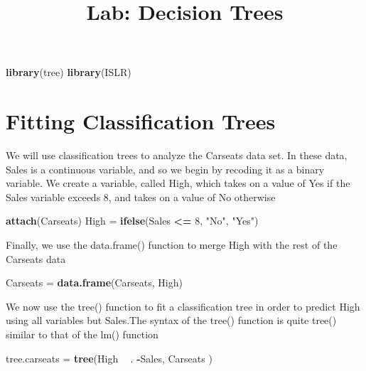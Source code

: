 \documentclass[]{article}
\title{Lab: Decision Trees}
\author{}
\date{}
\newenvironment{Shaded}{\begin{snugshade}}{\end{snugshade}}
\newcommand{\KeywordTok}[1]{\textcolor[rgb]{0.13,0.29,0.53}{\textbf{#1}}}
\newcommand{\DecValTok}[1]{\textcolor[rgb]{0.00,0.00,0.81}{#1}}
\newcommand{\StringTok}[1]{\textcolor[rgb]{0.31,0.60,0.02}{#1}}
\newcommand{\OperatorTok}[1]{\textcolor[rgb]{0.81,0.36,0.00}{\textbf{#1}}}
\newcommand{\NormalTok}[1]{#1}
\begin{document}
\maketitle

\begin{Shaded}
\begin{Highlighting}[]
\KeywordTok{library}\NormalTok{(tree)}
\KeywordTok{library}\NormalTok{(ISLR)}
\end{Highlighting}
\end{Shaded}

\section{Fitting Classification
Trees}\label{fitting-classification-trees}

We will use classification trees to analyze the Carseats data set. In
these data, Sales is a continuous variable, and so we begin by recoding
it as a binary variable. We create a variable, called High, which takes
on a value of Yes if the Sales variable exceeds 8, and takes on a value
of No otherwise

\begin{Shaded}
\begin{Highlighting}[]
\KeywordTok{attach}\NormalTok{(Carseats)}
\NormalTok{High =}\StringTok{ }\KeywordTok{ifelse}\NormalTok{(Sales }\OperatorTok{<=}\StringTok{ }\DecValTok{8}\NormalTok{, }\StringTok{"No"}\NormalTok{, }\StringTok{"Yes"}\NormalTok{)}
\end{Highlighting}
\end{Shaded}

Finally, we use the data.frame() function to merge High with the rest of
the Carseats data

\begin{Shaded}
\begin{Highlighting}[]
\NormalTok{Carseats =}\StringTok{ }\KeywordTok{data.frame}\NormalTok{(Carseats, High)}
\end{Highlighting}
\end{Shaded}

We now use the tree() function to fit a classification tree in order to
predict High using all variables but Sales.The syntax of the tree()
function is quite tree() similar to that of the lm() function

\begin{Shaded}
\begin{Highlighting}[]
\NormalTok{tree.carseats =}\StringTok{ }\KeywordTok{tree}\NormalTok{(High }\OperatorTok{~}\StringTok{ }\NormalTok{. }\OperatorTok{-}\NormalTok{Sales, Carseats )}
\end{Highlighting}
\end{Shaded}
\end{document}
